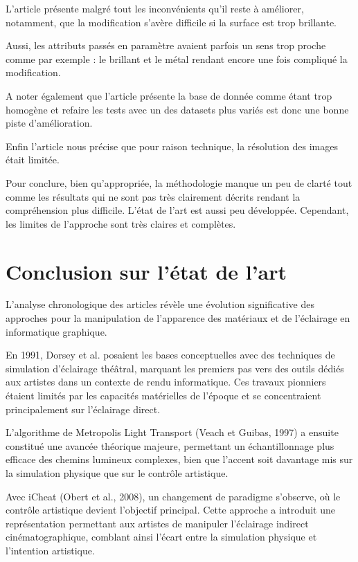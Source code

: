 \documentclass{article}
\begin{document}
L’article présente malgré tout les inconvénients qu’il reste à améliorer, notamment, que la modification s’avère difficile si la surface est trop brillante.

Aussi, les attributs passés en paramètre avaient parfois un sens trop proche comme par exemple : le brillant et le métal rendant encore une fois compliqué la modification.

A noter également que l’article présente la base de donnée comme étant trop homogène et refaire les tests avec un des datasets plus variés est donc une bonne piste d’amélioration.

Enfin l’article nous précise que pour raison technique, la résolution des images était limitée.

Pour conclure, bien qu’appropriée, la méthodologie manque un peu de clarté tout comme les résultats qui ne sont pas très clairement décrits rendant la compréhension plus difficile. L’état de l’art est aussi peu développée. Cependant, les limites de l’approche sont très claires et complètes.


\newpage
\section{Conclusion sur l'état de l'art}

L'analyse chronologique des articles révèle une évolution significative des approches pour la manipulation de l'apparence des matériaux et de l'éclairage en informatique graphique.

En 1991, Dorsey et al. posaient les bases conceptuelles avec des techniques de simulation d'éclairage théâtral, marquant les premiers pas vers des outils dédiés aux artistes dans un contexte de rendu informatique. Ces travaux pionniers étaient limités par les capacités matérielles de l'époque et se concentraient principalement sur l'éclairage direct.

L'algorithme de Metropolis Light Transport (Veach et Guibas, 1997) a ensuite constitué une avancée théorique majeure, permettant un échantillonnage plus efficace des chemins lumineux complexes, bien que l'accent soit davantage mis sur la simulation physique que sur le contrôle artistique.

Avec iCheat (Obert et al., 2008), un changement de paradigme s'observe, où le contrôle artistique devient l'objectif principal. Cette approche a introduit une représentation permettant aux artistes de manipuler l'éclairage indirect cinématographique, comblant ainsi l'écart entre la simulation physique et l'intention artistique.
\end{document}
